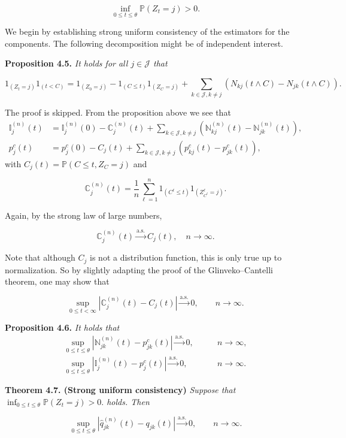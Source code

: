 \documentclass[a4paper,10pt,openany]{book}
\begin{document}
\[
\inf_{0\le t\le \theta}\mathbb P(Z_t=j)>0.
\]

We begin by establishing strong uniform consistency of the estimators for the components. The following decomposition might be of independent interest.

\textbf{Proposition 4.5.} \emph{It holds for all \(j\in\mathcal J\) that}

\[
1_{(Z_t=j)}1_{(t<C)}=1_{(Z_0=j)}-1_{(C\le t)}1_{(Z_C=j)}+\sum_{k\in \mathcal J, k\ne j} \left(N_{kj}(t\wedge C)-N_{jk}(t\wedge C)\right).
\]

The proof is skipped. From the proposition above we see that
\begin{align*}
\mathbb I_{j}^{(n)}(t)&=\mathbb I_{j}^{(n)}(0)-\mathbb C_{j}^{(n)}(t)+\sum_{k\in \mathcal J, k\ne j} \left(\mathbb N_{kj}^{(n)}(t)-\mathbb N_{jk}^{(n)}(t)\right),\\
p_j^c(t)&=p_j^c(0)-C_j(t)+\sum_{k\in \mathcal J, k\ne j} \left(p_{kj}^c(t)-p_{jk}^c(t)\right),
\end{align*}
with \(C_j(t)=\mathbb P(C\le t, Z_C=j)\) and

\[
\mathbb C_{j}^{(n)}(t)=\frac{1}{n}\sum_{\ell = 1}^n 1_{(C^\ell \le t)}1_{(Z^\ell_{C^\ell}=j)}.
\]

Again, by the strong law of large numbers,

\[
\mathbb C_{j}^{(n)}(t)\stackrel{\text{a.s.}}{\to}C_{j}(t),\quad n\to\infty.
\]

Note that although \(C_j\) is not a distribution function, this is only true up to normalization. So by slightly adapting the proof of the Glinveko--Cantelli theorem, one may show that

\[
\sup_{0\le t<\infty}\left\vert \mathbb C_{j}^{(n)}(t) - C_{j}(t)\right\vert\stackrel{\text{a.s.}}{\to}0,\qquad n\to \infty.
\]

\textbf{Proposition 4.6.} \emph{It holds that}
\begin{align*}
\sup_{0\le t\le \theta}\left\vert \mathbb N_{jk}^{(n)}(t) - p_{jk}^c(t)\right\vert\stackrel{\text{a.s.}}{\to}0,&\qquad n\to \infty,\\
\sup_{0\le t\le \theta}\left\vert \mathbb I_{j}^{(n)}(t) - p_{j}^c(t)\right\vert\stackrel{\text{a.s.}}{\to}0,&\qquad n\to \infty.
\end{align*}

\textbf{Theorem 4.7. (Strong uniform consistency)} \emph{Suppose that \(\inf_{0\le t\le \theta}\mathbb P(Z_t=j)>0.\) holds. Then}

\[
\sup_{0\le t\le \theta}\left\vert \hat q_{jk}^{(n)}(t) - q_{jk}(t)\right\vert\stackrel{\text{a.s.}}{\to}0,\qquad n\to \infty.
\]
\end{document}
